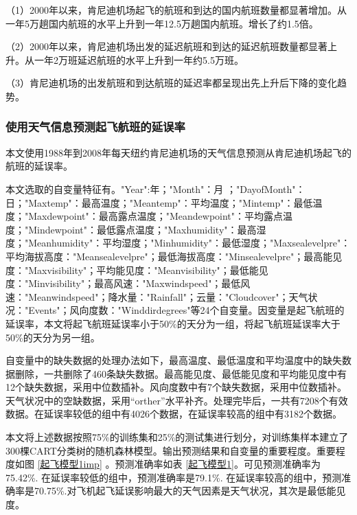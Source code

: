 \documentclass[12pt,a4paper,onecolumn]{article}
\begin{document}
（1）2000年以来，肯尼迪机场起飞的航班和到达的国内航班数量都显著增加。从一年5万趟国内航班的水平上升到一年12.5万趟国内航班。增长了约1.5倍。

（2）2000年以来，肯尼迪机场出发的延迟航班和到达的延迟航班数量都显著上升。从一年2万班延迟航班的水平上升到一年约5.5万班。

（3）肯尼迪机场的出发航班和到达航班的延迟率都呈现出先上升后下降的变化趋势。

\subsubsection{使用天气信息预测起飞航班的延误率}

本文使用1988年到2008年每天纽约肯尼迪机场的天气信息预测从肯尼迪机场起飞的航班的延误率。

本文选取的自变量特征有。"Year":年；"Month"：月  ；"DayofMonth"：日；"Maxtemp"：最高温度；"Meantemp"：平均温度；"Mintemp"：最低温度；"Maxdewpoint"：最高露点温度；"Meandewpoint"：平均露点温度；"Mindewpoint"：最低露点温度；"Maxhumidity"：最高湿度；"Meanhumidity"：平均湿度；"Minhumidity"：最低湿度；"Maxsealevelpre"：平均海拔高度："Meansealevelpre"；最低海拔高度："Minsealevelpre"；最高能见度："Maxvisibility"；平均能见度："Meanvisibility"；最低能见度："Minvisibility"；最高风速："Maxwindspeed"；最低风速："Meanwindspeed"；降水量："Rainfall"；云量："Cloudcover"；天气状况："Events"；风向度数："Winddirdegrees"等24个自变量。因变量是起飞航班的延误率，本文将起飞航班延误率小于50\%的天分为一组，将起飞航班延误率大于50\%的天分为另一组。

自变量中的缺失数据的处理办法如下，最高温度、最低温度和平均温度中的缺失数据删除，一共删除了460条缺失数据。最高能见度、最低能见度和平均能见度中有12个缺失数据，采用中位数插补。风向度数中有7个缺失数据，采用中位数插补。天气状况中的空缺数据，采用“orther”水平补齐。处理完毕后，一共有7208个有效数据。在延误率较低的组中有4026个数据，在延误率较高的组中有3182个数据。

本文将上述数据按照75\%的训练集和25\%的测试集进行划分，对训练集样本建立了300棵CART分类树的随机森林模型。输出预测结果和自变量的重要程度。重要程度如图 \ref{起飞模型1imp} 。预测准确率如表 \ref{起飞模型1}。可见预测准确率为75.42\%. 在延误率较低的组中，预测准确率是79.1\%. 在延误率较高的组中，预测准确率是70.75\%.对飞机起飞延误影响最大的天气因素是天气状况，其次是最低能见度。
\end{document}
